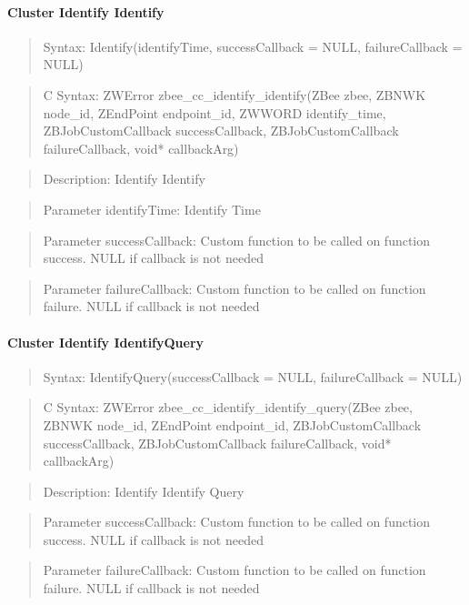 \paragraph{Cluster Identify Identify}
\begin{quote}Syntax: Identify(identifyTime, successCallback = NULL, failureCallback = NULL)\end{quote}
\begin{quote}C Syntax: ZWError zbee\_cc\_identify\_identify(ZBee zbee, ZBNWK node\_id, ZEndPoint endpoint\_id, ZWWORD identify\_time, ZBJobCustomCallback successCallback, ZBJobCustomCallback failureCallback, void* callbackArg)\end{quote}
\begin{quote}Description: Identify Identify\end{quote}
\begin{quote}Parameter identifyTime: Identify Time\end{quote}
\begin{quote}Parameter successCallback: Custom function to be called on function success. NULL if callback is not needed\end{quote}
\begin{quote}Parameter failureCallback: Custom function to be called on function failure. NULL if callback is not needed\end{quote}


\paragraph{Cluster Identify IdentifyQuery}
\begin{quote}Syntax: IdentifyQuery(successCallback = NULL, failureCallback = NULL)\end{quote}
\begin{quote}C Syntax: ZWError zbee\_cc\_identify\_identify\_query(ZBee zbee, ZBNWK node\_id, ZEndPoint endpoint\_id, ZBJobCustomCallback successCallback, ZBJobCustomCallback failureCallback, void* callbackArg)\end{quote}
\begin{quote}Description: Identify Identify Query\end{quote}
\begin{quote}Parameter successCallback: Custom function to be called on function success. NULL if callback is not needed\end{quote}
\begin{quote}Parameter failureCallback: Custom function to be called on function failure. NULL if callback is not needed\end{quote}


